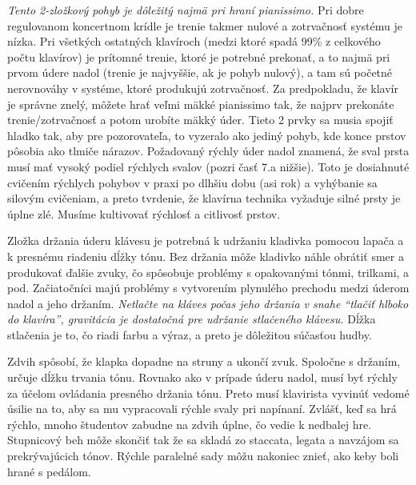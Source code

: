 \emph{Tento 2-zložkový pohyb je dôležitý najmä pri hraní pianissimo.} Pri dobre regulovanom koncertnom krídle je trenie takmer nulové a zotrvačnosť systému je nízka. Pri všetkých ostatných klavíroch (medzi ktoré spadá 99\% z celkového počtu klavírov) je prítomné  trenie, ktoré je potrebné prekonať, a to najmä pri prvom údere nadol (trenie je najvyššie, ak je pohyb nulový), a tam sú početné nerovnováhy v systéme, ktoré produkujú zotrvačnosť. Za predpokladu, že klavír je správne znelý, môžete hrať veľmi mäkké pianissimo tak, že najprv prekonáte trenie/zotrvačnosť a potom urobíte mäkký úder. Tieto 2 prvky sa musia spojiť hladko tak, aby pre pozorovateľa, to vyzeralo ako jediný pohyb, kde konce prstov pôsobia ako tlmiče nárazov. Požadovaný rýchly úder nadol znamená, že sval prsta musí mať vysoký podiel rýchlych svalov (pozri časť 7.a nižšie). Toto je dosiahnuté cvičením rýchlych pohybov v praxi po dlhšiu dobu (asi rok) a vyhýbanie sa silovým cvičeniam, a preto tvrdenie, že klavírna technika vyžaduje silné prsty je úplne zlé. Musíme kultivovať rýchlosť a citlivosť prstov.

Zložka držania úderu klávesu je potrebná k udržaniu kladivka pomocou lapača a k presnému riadeniu dĺžky tónu.  Bez držania môže kladivko náhle obrátiť smer a produkovať ďalšie zvuky, čo spôsobuje problémy s opakovanými tónmi, trilkami, a pod. Začiatočníci majú problémy s vytvorením plynulého prechodu medzi úderom nadol a jeho držaním. \emph{Netlačte na kláves počas jeho držania v snahe “tlačiť hlboko do klavíra”, gravitácia je dostatočná pre udržanie stlačeného klávesu.} Dĺžka stlačenia je to, čo riadi farbu a výraz, a preto je dôležitou súčasťou hudby.

Zdvih spôsobí, že klapka dopadne na struny a ukončí zvuk. Spoločne s držaním, určuje dĺžku trvania tónu. Rovnako ako v prípade úderu nadol, musí byť rýchly za účelom ovládania presného držania tónu. Preto musí klavirista vyvinúť vedomé úsilie na to, aby sa mu vypracovali rýchle svaly pri napínaní. Zvlášť, keď sa hrá rýchlo, mnoho študentov zabudne na zdvih úplne, čo vedie k nedbalej hre. Stupnicový beh môže skončiť tak že sa skladá zo staccata, legata a navzájom sa prekrývajúcich tónov. Rýchle paralelné sady môžu nakoniec znieť, ako keby boli hrané s pedálom.

